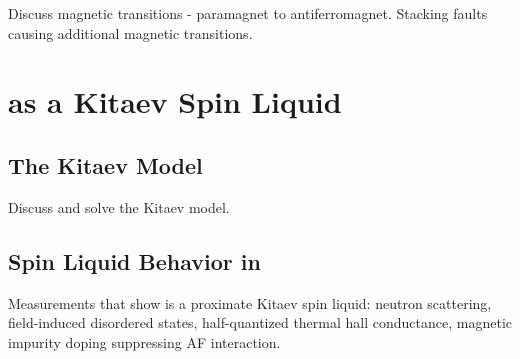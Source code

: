 Discuss magnetic transitions - paramagnet to antiferromagnet. Stacking faults causing additional magnetic transitions.

\section{\texorpdfstring{\rucl}{RuCl3}as a Kitaev Spin Liquid}

\subsection{The Kitaev Model}

Discuss and solve the Kitaev model.

\subsection{Spin Liquid Behavior in \texorpdfstring{\rucl}{RuCl3}}

Measurements that show \rucl is a proximate Kitaev spin liquid: neutron scattering, field-induced disordered states, half-quantized thermal hall conductance, magnetic impurity doping suppressing AF interaction.